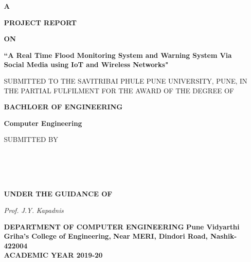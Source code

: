 \documentclass[a4paper,12pt]{report}
\begin{document}
\begin{center}
\noindent \large\textbf A 

\noindent \large \textbf { PROJECT REPORT}

\noindent \textbf { ON}

\noindent \textbf{``A Real Time Flood Monitoring System and Warning System Via Social Media using IoT and Wireless Networks"}


\noindent \textbf{}

\noindent\large
SUBMITTED TO THE SAVITRIBAI PHULE PUNE UNIVERSITY, PUNE, IN THE PARTIAL FULFILMENT FOR THE AWARD OF THE DEGREE OF

\hspace{0.1in} 

\noindent\large\textbf{BACHLOER OF ENGINEERING}

\textbf{ Computer Engineering}



\noindent \large SUBMITTED BY

\noindent \textbf{}
\\
\\
\\ 
\\


\newline
\vspace{0.2in}
\large{\textbf{ UNDER THE GUIDANCE OF}} 

\large{\it Prof. J.Y. Kapadnis }

\noindent \textbf{}
\begin{figure}[tph!]
  
    \label{fig:verticalcell}
\end{figure}

\noindent \large\textbf{DEPARTMENT OF COMPUTER ENGINEERING}
\noindent \textbf{
\newline Pune Vidyarthi Griha's College of Engineering,}
\noindent \large\textbf{\newline Near MERI, Dindori Road, Nashik-422004}\\
\large\textbf{ ACADEMIC YEAR 2019-20 }
\textbf{}
\end{center}
\newpage
\noindent \textbf{}
\end{document}
